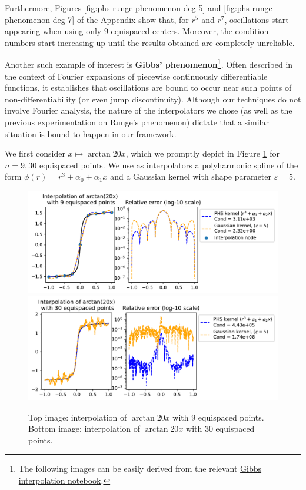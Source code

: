 \documentclass[12pt]{report} %
\begin{document}
Furthermore, Figures \ref{fig:phs-runge-phenomenon-deg-5} and \ref{fig:phs-runge-phenomenon-deg-7} of the Appendix show that, for $r^5$ and $r^7$, oscillations start appearing when using only 9 equispaced centers. Moreover, the condition numbers start increasing up until the results obtained are completely unreliable.

Another such example of interest is \textbf{Gibbs' phenomenon}\footnote{The following images can be easily derived from the relevant \href{https://github.com/heqro/tfm-experiments/blob/main/introductory_notebooks/rbf_interpolation/gibbs_rbf_and_phs.ipynb}{Gibbs interpolation notebook}.}. Often described in the context of Fourier expansions of piecewise continuously differentiable functions, it establishes that oscillations are bound to occur near such points of non-differentiability (or even jump discontinuity). 
Although our techniques do not involve Fourier analysis, the nature of the interpolators we chose (as well as the previous experimentation on Runge's phenomenon) dictate that a similar situation is bound to happen in our framework. 

We first consider $x \mapsto \arctan{20x}$, which we promptly depict in Figure \ref{fig:arctan-with-points} for $n=9, 30$ equispaced points. We use as interpolators a polyharmonic spline of the form $\phi(r) = r^3+\alpha_0+\alpha_1 x$ and a Gaussian kernel with shape parameter $\varepsilon=5$. 

\begin{figure}[ht]
    \centering
    \includegraphics[width=\textwidth]{imagenes/experiments/1d/intro/arctan-with-9-pts.pdf}
    \includegraphics[width=\textwidth]{imagenes/experiments/1d/intro/arctan-with-30-pts.pdf}
    \caption{Top image: interpolation of $\arctan{20x}$ with 9 equispaced points. Bottom image: interpolation of $\arctan{20x}$ with 30 equispaced points. }
    \label{fig:arctan-with-points}
\end{figure}
\end{document}
